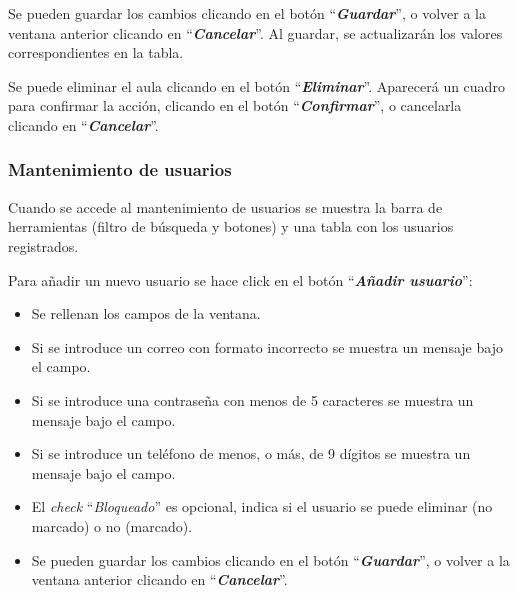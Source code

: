 Se pueden guardar los cambios clicando en el botón ``\textbf{\textit{Guardar}}'', o volver a la ventana anterior clicando en ``\textbf{\textit{Cancelar}}''. Al guardar, se actualizarán los valores correspondientes en la tabla.

Se puede eliminar el aula clicando en el botón ``\textbf{\textit{Eliminar}}''. Aparecerá un cuadro para confirmar la acción, clicando en el botón ``\textbf{\textit{Confirmar}}'', o cancelarla clicando en ``\textbf{\textit{Cancelar}}''.
        

\subsubsection{Mantenimiento de usuarios}
Cuando se accede al mantenimiento de usuarios se muestra la barra de herramientas (filtro de búsqueda y botones) y una tabla con los usuarios registrados.


Para añadir un nuevo usuario se hace click en el botón ``\textbf{\textit{Añadir usuario}}'':
\begin{itemize}
    \item Se rellenan los campos de la ventana.
        \item Si se introduce un correo con formato incorrecto se muestra un mensaje bajo el campo.
        
        
        \item Si se introduce una contraseña con menos de 5 caracteres se muestra un mensaje bajo el campo.
        
        
        \item Si se introduce un teléfono de menos, o más, de 9 dígitos se muestra un mensaje bajo el campo.
        
        
        \item El \textit{check} ``\textit{Bloqueado}'' es opcional, indica si el usuario se puede eliminar (no marcado) o no (marcado).
    
    \item Se pueden guardar los cambios clicando en el botón ``\textbf{\textit{Guardar}}'', o volver a la ventana anterior clicando en ``\textbf{\textit{Cancelar}}''.
\end{itemize}

